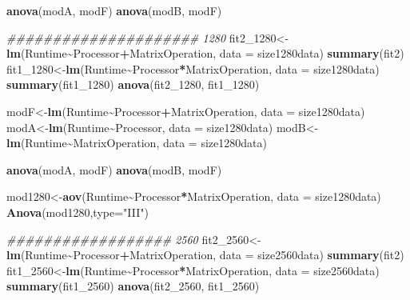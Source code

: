 \documentclass[
]{article}
\newenvironment{Shaded}{\begin{snugshade}}{\end{snugshade}}
\newcommand{\CommentTok}[1]{\textcolor[rgb]{0.56,0.35,0.01}{\textit{#1}}}
\newcommand{\DataTypeTok}[1]{\textcolor[rgb]{0.13,0.29,0.53}{#1}}
\newcommand{\DecValTok}[1]{\textcolor[rgb]{0.00,0.00,0.81}{#1}}
\newcommand{\KeywordTok}[1]{\textcolor[rgb]{0.13,0.29,0.53}{\textbf{#1}}}
\newcommand{\NormalTok}[1]{#1}
\newcommand{\OperatorTok}[1]{\textcolor[rgb]{0.81,0.36,0.00}{\textbf{#1}}}
\newcommand{\StringTok}[1]{\textcolor[rgb]{0.31,0.60,0.02}{#1}}
\begin{document}
\begin{Shaded}
\begin{Highlighting}[]
\KeywordTok{anova}\NormalTok{(modA, modF)}
\KeywordTok{anova}\NormalTok{(modB, modF)}

\CommentTok{\#\#\#\#\#\#\#\#\#\#\#\#\#\#\#\#\#\#\#\#\# 1280}
\NormalTok{fit2\_}\DecValTok{1280}\NormalTok{\textless{}{-}}\KeywordTok{lm}\NormalTok{(Runtime}\OperatorTok{\textasciitilde{}}\NormalTok{Processor}\OperatorTok{+}\NormalTok{MatrixOperation, }\DataTypeTok{data =}\NormalTok{ size1280data)}
\KeywordTok{summary}\NormalTok{(fit2)}
\NormalTok{fit1\_}\DecValTok{1280}\NormalTok{\textless{}{-}}\KeywordTok{lm}\NormalTok{(Runtime}\OperatorTok{\textasciitilde{}}\NormalTok{Processor}\OperatorTok{*}\NormalTok{MatrixOperation, }\DataTypeTok{data =}\NormalTok{ size1280data)}
\KeywordTok{summary}\NormalTok{(fit1\_}\DecValTok{1280}\NormalTok{)}
\KeywordTok{anova}\NormalTok{(fit2\_}\DecValTok{1280}\NormalTok{, fit1\_}\DecValTok{1280}\NormalTok{)}

\NormalTok{modF\textless{}{-}}\KeywordTok{lm}\NormalTok{(Runtime}\OperatorTok{\textasciitilde{}}\NormalTok{Processor}\OperatorTok{+}\NormalTok{MatrixOperation, }\DataTypeTok{data =}\NormalTok{ size1280data)}
\NormalTok{modA\textless{}{-}}\KeywordTok{lm}\NormalTok{(Runtime}\OperatorTok{\textasciitilde{}}\NormalTok{Processor, }\DataTypeTok{data =}\NormalTok{ size1280data)}
\NormalTok{modB\textless{}{-}}\KeywordTok{lm}\NormalTok{(Runtime}\OperatorTok{\textasciitilde{}}\NormalTok{MatrixOperation, }\DataTypeTok{data =}\NormalTok{ size1280data)}

\KeywordTok{anova}\NormalTok{(modA, modF)}
\KeywordTok{anova}\NormalTok{(modB, modF)}

\NormalTok{mod1280\textless{}{-}}\KeywordTok{aov}\NormalTok{(Runtime}\OperatorTok{\textasciitilde{}}\NormalTok{Processor}\OperatorTok{*}\NormalTok{MatrixOperation, }\DataTypeTok{data =}\NormalTok{ size1280data)}
\KeywordTok{Anova}\NormalTok{(mod1280,}\DataTypeTok{type=}\StringTok{"III"}\NormalTok{)}

\CommentTok{\#\#\#\#\#\#\#\#\#\#\#\#\#\#\#\#\#\# 2560}
\NormalTok{fit2\_}\DecValTok{2560}\NormalTok{\textless{}{-}}\KeywordTok{lm}\NormalTok{(Runtime}\OperatorTok{\textasciitilde{}}\NormalTok{Processor}\OperatorTok{+}\NormalTok{MatrixOperation, }\DataTypeTok{data =}\NormalTok{ size2560data)}
\KeywordTok{summary}\NormalTok{(fit2)}
\NormalTok{fit1\_}\DecValTok{2560}\NormalTok{\textless{}{-}}\KeywordTok{lm}\NormalTok{(Runtime}\OperatorTok{\textasciitilde{}}\NormalTok{Processor}\OperatorTok{*}\NormalTok{MatrixOperation, }\DataTypeTok{data =}\NormalTok{ size2560data)}
\KeywordTok{summary}\NormalTok{(fit1\_}\DecValTok{2560}\NormalTok{)}
\KeywordTok{anova}\NormalTok{(fit2\_}\DecValTok{2560}\NormalTok{, fit1\_}\DecValTok{2560}\NormalTok{)}


\end{Highlighting}
\end{Shaded}
\end{document}

